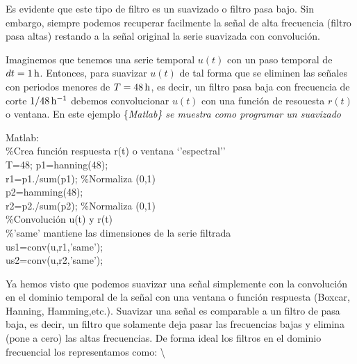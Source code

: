 \documentclass[
]{agujournal2019}
\begin{document}
\begin{center}
\end{center}

Es evidente que este tipo de filtro es un suavizado o filtro pasa bajo.
Sin embargo, siempre podemos recuperar facilmente la señal de alta
frecuencia (filtro pasa altas) restando a la señal original la serie
suavizada con convolución.

Imaginemos que tenemos una serie temporal \(u(t)\) con un paso temporal
de \(dt=1\,{\rm h}\). Entonces, para suavizar \(u(t)\) de tal forma que
se eliminen las señales con periodos menores de \(T=48\,{\rm h}\), es
decir, un filtro pasa baja con frecuencia de corte
\(1/48\,{\rm h}^{-1}\) debemos convolucionar \(u(t)\) con una función de
resouesta \(r(t)\) o ventana. En este ejemplo \{\it Matlab\} se muestra
como programar un suavizado

\begin{framed}
{\textbf \noindent Matlab}:\\
\%Crea función respuesta r(t) o ventana `'espectral''\\
T=48; %
p1=hanning(48);\\
r1=p1./sum(p1); \%Normaliza (0,1)\\
p2=hamming(48);\\
r2=p2./sum(p2); \%Normaliza (0,1)\\

\%Convolución u(t) y r(t)\\
\%'same' mantiene las dimensiones de la serie filtrada\\
us1=conv(u,r1,'same');\\
us2=conv(u,r2,'same');\\

\end{framed}

Ya hemos visto que podemos suavizar una señal simplemente con la
convolución en el dominio temporal de la señal con una ventana o función
respuesta (Boxcar, Hanning, Hamming,etc.). Suavizar una señal es
comparable a un filtro de pasa baja, es decir, un filtro que solamente
deja pasar las frecuencias bajas y elimina (pone a cero) las altas
frecuencias. De forma ideal los filtros en el dominio frecuencial los
representamos como: \textbackslash{}
\end{document}
